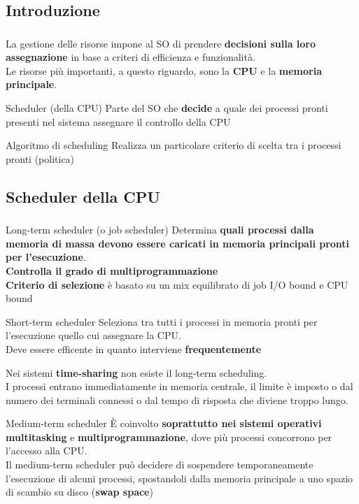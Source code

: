 \documentclass{beamer}
\newenvironment{mainframe}{
	\begin{frame}
		\frametitle{\insertsubsection}
		\framesubtitle{\insertsection}
	}{
	\end{frame}
}
\begin{document}
\subsection{Introduzione}
\begin{mainframe}
	La gestione delle risorse impone al SO di prendere \textbf{decisioni sulla loro assegnazione} in base a criteri di efficienza e funzionalità.\\
	Le risorse più importanti, a questo riguardo, sono la \textbf{CPU} e la \textbf{memoria principale}.
	\begin{block}{Scheduler (della CPU)}
		Parte del SO che \textbf{decide} a quale dei processi pronti presenti nel sistema assegnare il controllo della CPU
	\end{block}
	\begin{block}{Algoritmo di scheduling}
		Realizza un particolare criterio di scelta tra i processi pronti (politica)
	\end{block}
\end{mainframe}
\subsection{Scheduler della CPU}
\begin{mainframe}
	\begin{block}{Long-term scheduler (o job scheduler)}
		Determina \textbf{quali processi dalla memoria di massa devono essere caricati in memoria principali pronti per l'esecuzione}.\\
		\textbf{Controlla il grado di multiprogrammazione}\\
		\textbf{Criterio di selezione} è basato su un mix equilibrato di job I/O bound e CPU bound
	\end{block}
	\begin{block}{Short-term scheduler}
		Seleziona tra tutti i processi in memoria pronti per l'esecuzione quello cui assegnare la CPU.\\
		Deve essere efficente in quanto interviene \textbf{frequentemente}
	\end{block}
\end{mainframe}
\begin{frame}
	Nei sistemi \textbf{time-sharing} non esiste il long-term scheduling.\\
	I processi entrano immediatamente in memoria centrale, il limite è imposto o dal numero dei terminali connessi o dal tempo di risposta che diviene troppo lungo.\\
	\begin{block}{Medium-term scheduler}
		È coinvolto \textbf{soprattutto nei sistemi operativi multitasking} e \textbf{multiprogrammazione}, dove più processi concorrono per l'accesso alla CPU.\\
		Il medium-term scheduler può decidere di sospendere temporaneamente l'esecuzione di alcuni processi, spostandoli dalla memoria principale a uno spazio di scambio su disco (\textbf{swap space})
	\end{block} 
\end{frame}
\end{document}

